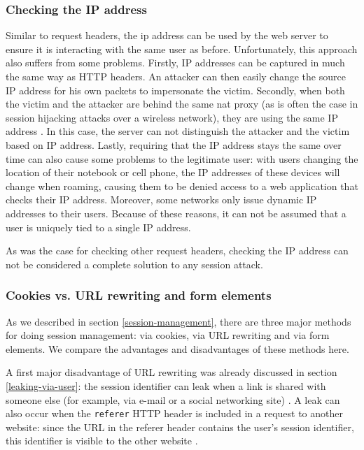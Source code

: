 \subsubsection{Checking the IP address}

Similar to request headers, the \gls{ip} address can be used by the web server to ensure it is interacting with the same user as before. Unfortunately, this approach also suffers from some problems. Firstly, IP addresses can be captured in much the same way as HTTP headers. An attacker can then easily change the source IP address for his own packets to impersonate the victim. Secondly, when both the victim and the attacker are behind the same \gls{nat} proxy (as is often the case in session hijacking attacks over a wireless network), they are using the same IP address \cite{Johns2011}. In this case, the server can not distinguish the attacker and the victim based on IP address. Lastly, requiring that the IP address stays the same over time can also cause some problems to the legitimate user: with users changing the location of their notebook or cell phone, the IP addresses of these devices will change when roaming, causing them to be denied access to a web application that checks their IP address. Moreover, some networks only issue dynamic IP addresses to their users. Because of these reasons, it can not be assumed that a user is uniquely tied to a single IP address.

As was the case for checking other request headers, checking the IP address can not be considered a complete solution to any session attack.

\subsubsection{Cookies vs. URL rewriting and form elements}\label{url-vs-cookies}

As we described in section \ref{session-management}, there are three major methods for doing session management: via cookies, via URL rewriting and via form elements. We compare the advantages and disadvantages of these methods here.

A first major disadvantage of URL rewriting was already discussed in section \ref{leaking-via-user}: the session identifier can leak when a link is shared with someone else (for example, via e-mail or a social networking site) \cite{Johnston2004}. A leak can also occur when the \texttt{referer} HTTP header is included in a request to another website: since the URL in the referer header contains the user's session identifier, this identifier is visible to the other website \cite{Fu2001}.

